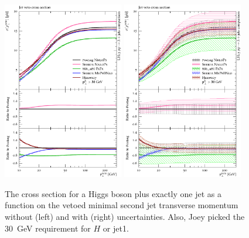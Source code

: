 \begin{figure}[t!]
  \centering
  \includegraphics[width=0.47\textwidth]{figures/hjetscomp_u_xs_jet_veto_j1_30.pdf}
  \hfill
  \includegraphics[width=0.47\textwidth]{figures/hjetscomp_xs_jet_veto_j1_30.pdf}
  \caption{
    The cross
    section for a Higgs boson plus exactly one jet as a function on
    the vetoed minimal second jet transverse momentum without
    (left) and with (right) uncertainties. Also, Joey picked the
    30~GeV requirement for $H$ or jet1.
    \label{fig:higgscomp:results:jvobs:jvxs1j}
  }
\end{figure}

